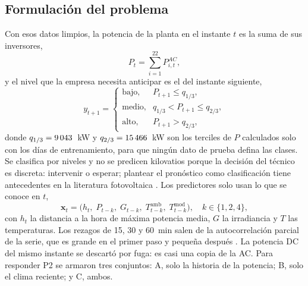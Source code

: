 \documentclass[conference]{IEEEtran}
\begin{document}
\subsection{Formulaci\'on del problema}
Con esos datos limpios, la potencia de la planta en el instante $t$ es la suma de sus inversores,
\begin{equation}
P_t=\sum_{i=1}^{22}P^{AC}_{i,t},
\label{eq:potencia}
\end{equation}
y el nivel que la empresa necesita anticipar es el del instante siguiente,
\begin{equation}
y_{t+1}=\begin{cases}\text{bajo}, & P_{t+1}\le q_{1/3},\\ \text{medio}, & q_{1/3}<P_{t+1}\le q_{2/3},\\ \text{alto}, & P_{t+1}>q_{2/3},\end{cases}
\label{eq:clases}
\end{equation}
donde $q_{1/3}=9\,043{}$~kW y $q_{2/3}=15\,466{}$~kW son los terciles de $P$ calculados solo con los d\'ias de entrenamiento, para que ning\'un dato de prueba defina las clases. Se clasifica por niveles y no se predicen kilovatios porque la decisi\'on del t\'ecnico es discreta: intervenir o esperar; plantear el pron\'ostico como clasificaci\'on tiene antecedentes en la literatura fotovoltaica \cite{theocharides}. Los predictores solo usan lo que se conoce en $t$,
\begin{equation}
\mathbf{x}_t=\big(h_t,\;P_{t-k},\;G_{t-k},\;T^{\mathrm{amb}}_{t-k},\;T^{\mathrm{mod}}_{t-k}\big),\quad k\in\{1,2,4\},
\label{eq:predictores}
\end{equation}
con $h_t$ la distancia a la hora de m\'axima potencia media, $G$ la irradiancia y $T$ las temperaturas. Los rezagos de 15, 30 y 60~min salen de la autocorrelaci\'on parcial de la serie, que es grande en el primer paso y peque\~na despu\'es \cite{cantillo}. La potencia DC del mismo instante se descart\'o por fuga: es casi una copia de la AC. Para responder P2 se armaron tres conjuntos: A, solo la historia de la potencia; B, solo el clima reciente; y C, ambos.
\end{document}

